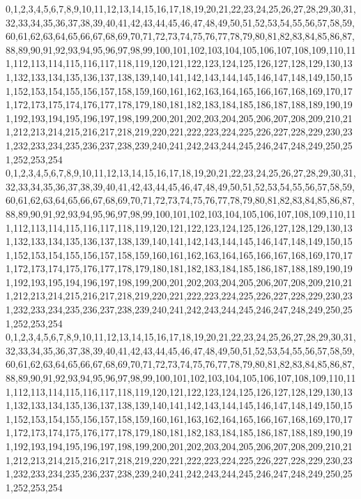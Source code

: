 \documentclass[12pt]{article}
\begin{document}
{0,1,2,3,4,5,6,7,8,9,10,11,12,13,14,15,16,17,18,19,20,21,22,23,24,25,26,27,28,29,30,31,32,33,34,35,36,37,38,39,40,41,42,43,44,45,46,47,48,49,50,51,52,53,54,55,56,57,58,59,60,61,62,63,64,65,66,67,68,69,70,71,72,73,74,75,76,77,78,79,80,81,82,83,84,85,86,87,88,89,90,91,92,93,94,95,96,97,98,99,100,101,102,103,104,105,106,107,108,109,110,111,112,113,114,115,116,117,118,119,120,121,122,123,124,125,126,127,128,129,130,131,132,133,134,135,136,137,138,139,140,141,142,143,144,145,146,147,148,149,150,151,152,153,154,155,156,157,158,159,160,161,162,163,164,165,166,167,168,169,170,171,172,173,175,174,176,177,178,179,180,181,182,183,184,185,186,187,188,189,190,191,192,193,194,195,196,197,198,199,200,201,202,203,204,205,206,207,208,209,210,211,212,213,214,215,216,217,218,219,220,221,222,223,224,225,226,227,228,229,230,231,232,233,234,235,236,237,238,239,240,241,242,243,244,245,246,247,248,249,250,251,252,253,254\\
0,1,2,3,4,5,6,7,8,9,10,11,12,13,14,15,16,17,18,19,20,21,22,23,24,25,26,27,28,29,30,31,32,33,34,35,36,37,38,39,40,41,42,43,44,45,46,47,48,49,50,51,52,53,54,55,56,57,58,59,60,61,62,63,64,65,66,67,68,69,70,71,72,73,74,75,76,77,78,79,80,81,82,83,84,85,86,87,88,89,90,91,92,93,94,95,96,97,98,99,100,101,102,103,104,105,106,107,108,109,110,111,112,113,114,115,116,117,118,119,120,121,122,123,124,125,126,127,128,129,130,131,132,133,134,135,136,137,138,139,140,141,142,143,144,145,146,147,148,149,150,151,152,153,154,155,156,157,158,159,160,161,162,163,164,165,166,167,168,169,170,171,172,173,174,175,176,177,178,179,180,181,182,183,184,185,186,187,188,189,190,191,192,193,195,194,196,197,198,199,200,201,202,203,204,205,206,207,208,209,210,211,212,213,214,215,216,217,218,219,220,221,222,223,224,225,226,227,228,229,230,231,232,233,234,235,236,237,238,239,240,241,242,243,244,245,246,247,248,249,250,251,252,253,254\\
0,1,2,3,4,5,6,7,8,9,10,11,12,13,14,15,16,17,18,19,20,21,22,23,24,25,26,27,28,29,30,31,32,33,34,35,36,37,38,39,40,41,42,43,44,45,46,47,48,49,50,51,52,53,54,55,56,57,58,59,60,61,62,63,64,65,66,67,68,69,70,71,72,73,74,75,76,77,78,79,80,81,82,83,84,85,86,87,88,89,90,91,92,93,94,95,96,97,98,99,100,101,102,103,104,105,106,107,108,109,110,111,112,113,114,115,116,117,118,119,120,121,122,123,124,125,126,127,128,129,130,131,132,133,134,135,136,137,138,139,140,141,142,143,144,145,146,147,148,149,150,151,152,153,154,155,156,157,158,159,160,161,163,162,164,165,166,167,168,169,170,171,172,173,174,175,176,177,178,179,180,181,182,183,184,185,186,187,188,189,190,191,192,193,194,195,196,197,198,199,200,201,202,203,204,205,206,207,208,209,210,211,212,213,214,215,216,217,218,219,220,221,222,223,224,225,226,227,228,229,230,231,232,233,234,235,236,237,238,239,240,241,242,243,244,245,246,247,248,249,250,251,252,253,254\\
}
\end{document}
